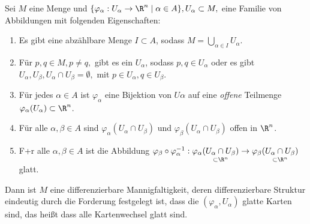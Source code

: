 \begin{lem}
	Sei $M$ eine Menge und $ \{\varphi_\alpha: U_\alpha \to \R^n \mid \alpha \in A\}, U_\alpha \subset M, $ eine Familie von Abbildungen mit folgenden Eigenschaften:
	\begin{enumerate}[label={\roman*})]
		\item Es gibt eine abzählbare Menge $ I \subset A $, sodass $ M = \bigcup\limits_{\alpha \in I}U_\alpha. $
		\item Für $ p,q \in M, p \neq q, $ gibt es ein $ U_\alpha $, sodass $ p,q \in U_\alpha $ oder es gibt $ U_\alpha,U_\beta, U_\alpha \cap U_\beta = \emptyset, $ mit $ p \in U_\alpha, q \in U_\beta. $
		\item Für jedes $ \alpha \in A $ ist $ \varphi_\alpha $ eine Bijektion von $ U\alpha $ auf eine \emph{offene} Teilmenge $ \varphi_\alpha(U_\alpha) \subset \R^n $.
		\item Für alle $ \alpha,\beta \in A $ sind $ \varphi_\alpha(U_\alpha \cap U_\beta) $ und $ \varphi_\beta(U_\alpha \cap U_\beta) $ offen in $\R^n$.
		\item F+r alle $ \alpha,\beta \in A $ ist die Abbildung $ \varphi_\beta \circ \varphi_\alpha^{-1}: \varphi_\alpha( \underset{\subset \R^n}{U_\alpha \cap U_\beta} ) \to \varphi_\beta( \underset{\subset \R^n}{U_\alpha \cap U_\beta} ) $ glatt.
	\end{enumerate}
	Dann ist $M$ eine differenzierbare Mannigfaltigkeit, deren differenzierbare Struktur eindeutig durch die Forderung festgelegt ist, dass die $ (\varphi_\alpha,U_\alpha) $ glatte Karten sind, das heißt dass alle Kartenwechsel glatt sind.
\end{lem}